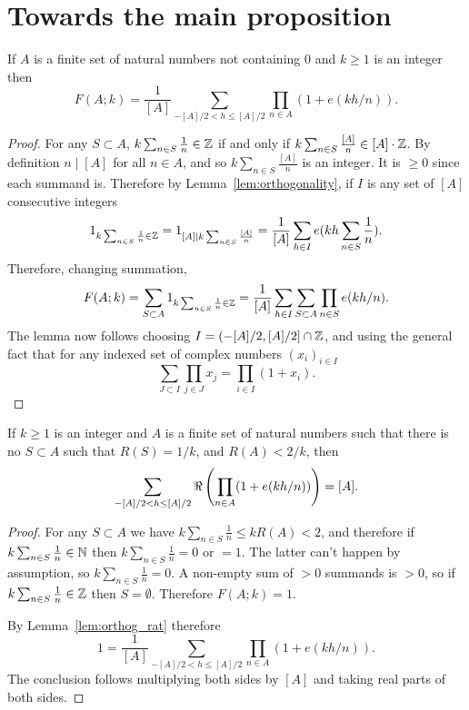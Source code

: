 \section{Towards the main proposition}

\begin{lemma}\label{lem:orthog_rat}
  \leanok
If $A$ is a finite set of natural numbers not containing $0$ and $k\geq 1$ is an integer then
\[F(A;k)= \frac{1}{[A]}\sum_{-[A]/2< h\leq [A]/2}\prod_{n\in A}(1+e(kh/n)).\]
\end{lemma}
\begin{proof}
  \leanok
{}
For any $S\subset A$,  $k\sum_{n\in S}\frac{1}{n}\in \mathbb{Z}$ if and only if $k\sum_{n\in S}\frac{[A]}{n}\in [A]\cdot \mathbb{Z}$. By definition $n\mid [A]$ for all $n\in A$, and so $k\sum_{n\in S}\frac{[A]}{n}$ is an integer. It is $\geq 0$ since each summand is. Therefore by Lemma~\ref{lem:orthogonality}, if $I$ is any set of $[A]$ consecutive integers
\[1_{k\sum_{n\in S}\frac{1}{n}\in \mathbb{Z}}=1_{[A]\mid k\sum_{n\in S}\frac{[A]}{n}} = \frac{1}{[A]}\sum_{h\in I}e(kh\sum_{n\in S}\frac{1}{n}).\]
Therefore, changing summation,
\[F(A;k) = \sum_{S\subset A}1_{k\sum_{n\in S}\frac{1}{n}\in \mathbb{Z}} = \frac{1}{[A]} \sum_{h\in I}\sum_{S\subset A}\prod_{n\in S}e(kh/n).\]
The lemma now follows choosing $I=(-[A]/2,[A]/2]\cap\mathbb{Z}$, and using the general fact that for any indexed set of complex numbers $(x_i)_{i\in I}$
\[\sum_{J\subset I}\prod_{j\in J}x_j = \prod_{i\in I}(1+x_i).\]
\end{proof}

\begin{lemma}\label{lem:orthog_simp}
  \leanok
If $k\geq 1$ is an integer and $A$ is a finite set of natural numbers such that there is no $S\subset A$ such that $R(S)=1/k$, and $R(A)<2/k$, then
\[\sum_{-[A]/2< h\leq [A]/2}\Re\left( \prod_{n\in A}(1+e(kh/n))\right)= [A].\]
\end{lemma}
\begin{proof}
  \leanok
For any $S\subset A$ we have $k\sum_{n\in S}\frac{1}{n}\leq kR(A)<2$, and therefore if $k\sum_{n\in S}\frac{1}{n} \in \mathbb{N}$ then $k\sum_{n\in S}\frac{1}{n} =0$ or $=1$. The latter can't happen by assumption, so $k\sum_{n\in S}\frac{1}{n} =0$. A non-empty sum of $>0$ summands is $>0$, so if $k\sum_{n\in S}\frac{1}{n}\in \mathbb{Z}$ then $S=\emptyset$. Therefore $F(A;k)=1$.

By Lemma~\ref{lem:orthog_rat} therefore
\[1=\frac{1}{[A]}\sum_{-[A]/2< h\leq [A]/2}\prod_{n\in A}(1+e(kh/n)).\]
The conclusion follows multiplying both sides by $[A]$ and taking real parts of both sides.
\end{proof}

